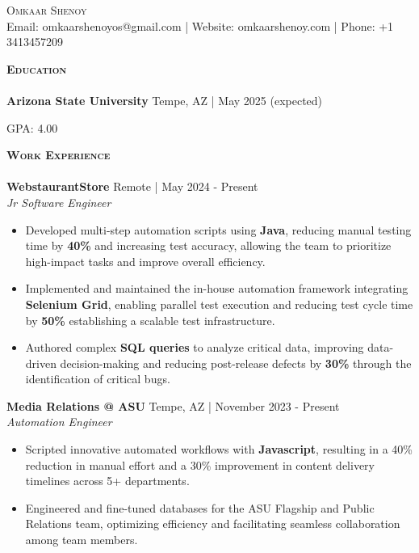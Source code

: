 \documentclass[10pt]{article}
\newcommand{\lineunder} {
    \vspace*{-8pt} \\
    \hspace*{-18pt} \hrulefill \\
}
\newcommand{\header} [1] {
    {\hspace*{-15pt}\vspace*{3pt} \textsc{#1}}
    \vspace*{-2pt} \lineunder
}
\begin{document}
\begin{center}
  {\Huge \scshape {Omkaar Shenoy}}\\
  \vspace{1mm}
  Email: omkaarshenoyos@gmail.com |  Website: omkaarshenoy.com | Phone: +1 3413457209
\end{center}
\header{\textbf{Education}}
\vspace{0.5mm}
\textbf{Arizona State University}   \hfill Tempe, AZ | May 2025 (expected)

 \hfill{GPA: 4.00}
\\
\vspace{2mm}
\header{\textbf{Work Experience}}
\vspace{0.5mm}
\textbf{WebstaurantStore} \hfill Remote | May 2024 - Present\\
\textit{Jr Software Engineer}\\
\vspace{-1mm}
\begin{itemize}[leftmargin=5mm, itemsep=0mm]
  
    \item Developed multi-step automation scripts using \textbf{Java}, reducing manual testing time by \textbf{40\%} and increasing test accuracy, allowing the team to prioritize high-impact tasks and improve overall efficiency.
    \item Implemented and maintained the in-house automation framework integrating \textbf{Selenium Grid}, enabling parallel test execution and reducing test cycle time by \textbf{50\%} establishing a scalable test infrastructure.
    \item Authored complex \textbf{SQL queries} to analyze critical data, improving data-driven decision-making and reducing post-release defects by \textbf{30\%} through the identification of critical bugs.
\end{itemize}


\textbf{Media Relations @ ASU} \hfill Tempe, AZ | November 2023 - Present\\
\textit{Automation Engineer}\\
\vspace{-1mm}
\begin{itemize}[leftmargin=5mm, itemsep=0mm]

  \item Scripted innovative automated workflows with \textbf{Javascript}, resulting in a 40\% reduction in manual effort and a 30\% improvement in content delivery timelines across 5+ departments.
  \item Engineered and fine-tuned databases for the ASU Flagship and Public Relations team, optimizing efficiency and facilitating seamless collaboration among team members.
\end{itemize} 
\end{document}
